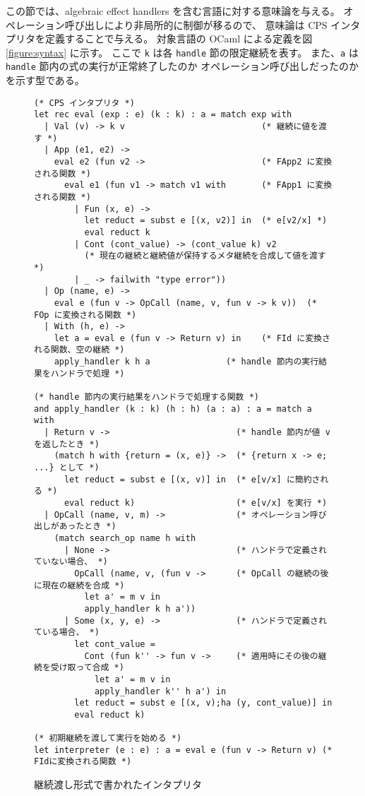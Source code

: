 この節では、algebraic effect handlers を含む言語に対する意味論を与える。
オペレーション呼び出しにより非局所的に制御が移るので、
意味論は CPS インタプリタを定義することで与える。
対象言語の OCaml による定義を図 \ref{figure:syntax} に示す。
ここで \texttt{k} は各 \texttt{handle} 節の限定継続を表す。
また、\texttt{a} は \texttt{handle} 節内の式の実行が正常終了したのか
オペレーション呼び出しだったのかを示す型である。

\begin{figure}
\begin{spacing}{0.9}
\begin{verbatim}
(* CPS インタプリタ *)
let rec eval (exp : e) (k : k) : a = match exp with
  | Val (v) -> k v                           (* 継続に値を渡す *)
  | App (e1, e2) ->
    eval e2 (fun v2 ->                       (* FApp2 に変換される関数 *)
      eval e1 (fun v1 -> match v1 with       (* FApp1 に変換される関数 *)
        | Fun (x, e) ->
          let reduct = subst e [(x, v2)] in  (* e[v2/x] *)
          eval reduct k
        | Cont (cont_value) -> (cont_value k) v2
          (* 現在の継続と継続値が保持するメタ継続を合成して値を渡す *)
        | _ -> failwith "type error"))
  | Op (name, e) ->
    eval e (fun v -> OpCall (name, v, fun v -> k v))  (* FOp に変換される関数 *)
  | With (h, e) ->
    let a = eval e (fun v -> Return v) in    (* FId に変換される関数、空の継続 *)
    apply_handler k h a               (* handle 節内の実行結果をハンドラで処理 *)

(* handle 節内の実行結果をハンドラで処理する関数 *)
and apply_handler (k : k) (h : h) (a : a) : a = match a with
  | Return v ->                         (* handle 節内が値 v を返したとき *)
    (match h with {return = (x, e)} ->  (* {return x -> e; ...} として *)
      let reduct = subst e [(x, v)] in  (* e[v/x] に簡約される *)
      eval reduct k)                    (* e[v/x] を実行 *)
  | OpCall (name, v, m) ->              (* オペレーション呼び出しがあったとき *)
    (match search_op name h with
      | None ->                         (* ハンドラで定義されていない場合、 *)
        OpCall (name, v, (fun v ->      (* OpCall の継続の後に現在の継続を合成 *)
          let a' = m v in
          apply_handler k h a'))
      | Some (x, y, e) ->               (* ハンドラで定義されている場合、 *)
        let cont_value =
          Cont (fun k'' -> fun v ->     (* 適用時にその後の継続を受け取って合成 *)
            let a' = m v in
            apply_handler k'' h a') in
        let reduct = subst e [(x, v);ha (y, cont_value)] in
        eval reduct k)

(* 初期継続を渡して実行を始める *)
let interpreter (e : e) : a = eval e (fun v -> Return v) (* FIdに変換される関数 *)
\end{verbatim}
\caption{継続渡し形式で書かれたインタプリタ}
\label{figure:1cps}
\end{spacing}
\end{figure}


